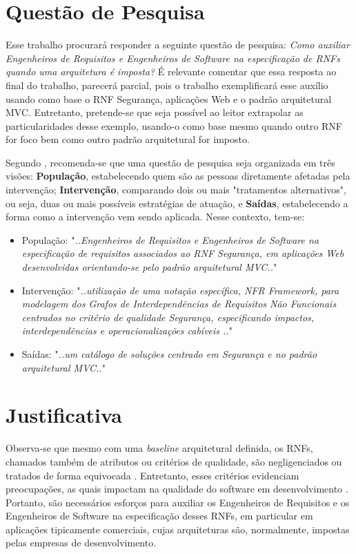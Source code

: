 \section{Questão de Pesquisa}
Esse trabalho procurará responder a seguinte questão de pesquisa: \textit{Como auxiliar Engenheiros de Requisitos e Engenheiros de Software na especificação de RNFs quando uma arquitetura é imposta?} É relevante comentar que essa resposta ao final do trabalho, parecerá parcial, pois o trabalho exemplificará esse auxílio usando como base o RNF Segurança, aplicações Web e o padrão arquitetural MVC. Entretanto, pretende-se que seja possível ao leitor extrapolar as particularidades desse exemplo, usando-o como base mesmo quando outro RNF for foco bem como outro padrão arquitetural for imposto.

Segundo \cite{keele2007guidelines}, recomenda-se que uma questão de pesquisa seja organizada em três visões: \textbf{População}, estabelecendo quem são as pessoas diretamente afetadas pela intervenção; \textbf{Intervenção}, comparando dois ou mais "tratamentos alternativos", ou seja, duas ou mais possíveis estratégias de atuação, e \textbf{Saídas}, estabelecendo a forma como a intervenção vem sendo aplicada. Nesse contexto, tem-se: 

\begin{itemize}
	\item População: "\textit{..Engenheiros de Requisitos e Engenheiros de Software na especificação de requisitos associados ao RNF Segurança, em aplicações Web desenvolvidas orientando-se pelo padrão arquitetural MVC..}"
	\item Intervenção: "\textit{..utilização de uma notação específica, NFR Framework, para modelagem dos Grafos de Interdependências de Requisitos Não Funcionais centrados no critério de qualidade Segurança, especificando impactos, interdependências e operacionalizações cabíveis  ..}"
	\item Saídas: "\textit{..um catálogo de soluções centrado em Segurança e no padrão arquitetural MVC..}"
\end{itemize}
\section{Justificativa}


Observa-se que mesmo com uma \textit{baseline}  arquitetural definida, os RNFs, chamados também de atributos ou critérios de qualidade, são negligenciados ou tratados de forma equivocada \cite{eckhardt2016non}. Entretanto, esses critérios evidenciam preocupações, as quais impactam na qualidade do software em desenvolvimento \cite{schneidewind1990standard}.  
Portanto, são necessários esforços para auxiliar os Engenheiros de Requisitos e os Engenheiros de Software na especificação desses RNFs, em particular em aplicações tipicamente comerciais, cujas arquiteturas são, normalmente, impostas pelas empresas de desenvolvimento.

